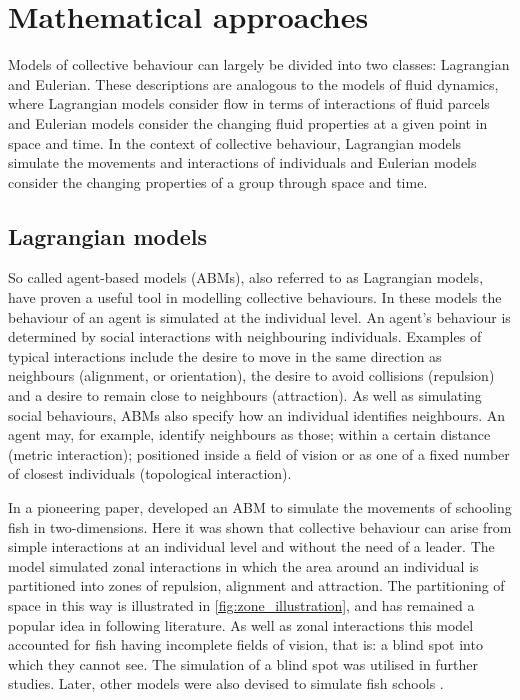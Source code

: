 \section{Mathematical approaches}
\label{sec:models}

Models of collective behaviour can largely be divided into two classes: Lagrangian and Eulerian. These descriptions are analogous to the models of fluid dynamics, where Lagrangian models consider flow in terms of interactions of fluid parcels and Eulerian models consider the changing fluid properties at a given point in space and time. In the context of collective behaviour, Lagrangian models simulate the movements and interactions of individuals and Eulerian models consider the changing properties of a group through space and time.

\subsection{Lagrangian models}
\label{ssec:lagrangian_models}

So called agent-based models (ABMs), also referred to as Lagrangian models, have proven a useful tool in modelling collective behaviours. In these models the behaviour of an agent is simulated at the individual level. An agent's behaviour is determined by social interactions with neighbouring individuals. Examples of typical interactions include the desire to move in the same direction as neighbours (alignment, or orientation), the desire to avoid collisions (repulsion) and a desire to remain close to neighbours (attraction). As well as simulating social behaviours, ABMs also specify how an individual identifies neighbours. An agent may, for example, identify neighbours as those; within a certain distance (metric interaction); positioned inside a field of vision or as one of a fixed number of closest individuals (topological interaction).

In a pioneering paper, \citet{aoki82} developed an ABM to simulate the movements of schooling fish in two-dimensions. Here it was shown that collective behaviour can arise from simple interactions at an individual level and without the need of a leader. The model simulated zonal interactions in which the area around an individual is partitioned into zones of repulsion, alignment and attraction. The partitioning of space in this way is illustrated in \cref{fig:zone_illustration}, and has remained a popular idea in following literature. As well as zonal interactions this model accounted for fish having incomplete fields of vision, that is: a blind spot into which they cannot see. The simulation of a blind spot was utilised in further studies. Later, other models were also devised to simulate fish schools \citep{okubo86, huth92}.

